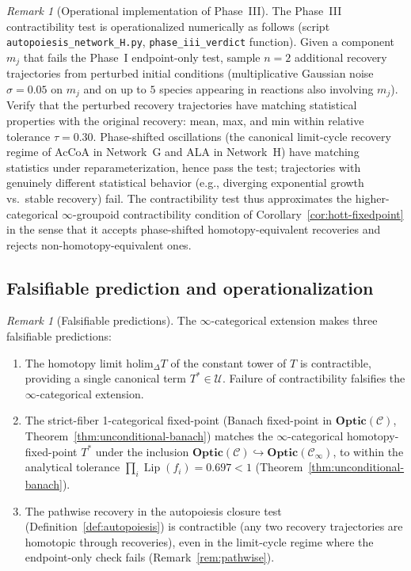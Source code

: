 \documentclass[11pt,a4paper]{article}
\theoremstyle{plain}
\theoremstyle{definition}
\theoremstyle{remark}
\newtheorem{remark}[theorem]{Remark}
\newcommand{\Optic}{\mathbf{Optic}}
\DeclareMathOperator{\Lip}{Lip}
\begin{document}
\begin{remark}[Operational implementation of Phase~III]
\label{rem:phase3-operational}
The Phase~III contractibility test is operationalized numerically as
follows (script \texttt{autopoiesis\_network\_H.py},
\texttt{phase\_iii\_verdict} function). Given a component $m_j$ that
fails the Phase~I endpoint-only test, sample $n = 2$ additional recovery
trajectories from perturbed initial conditions (multiplicative Gaussian
noise $\sigma = 0.05$ on $m_j$ and on up to $5$ species appearing in
reactions also involving $m_j$). Verify that the perturbed recovery
trajectories have matching statistical properties with the original
recovery: mean, max, and min within relative tolerance
$\tau = 0.30$. Phase-shifted oscillations (the canonical limit-cycle
recovery regime of AcCoA in Network~G and ALA in Network~H) have
matching statistics under reparameterization, hence pass the test;
trajectories with genuinely different statistical behavior (e.g.,
diverging exponential growth vs.\ stable recovery) fail. The
contractibility test thus approximates the higher-categorical
$\infty$-groupoid contractibility condition of Corollary~\ref{cor:hott-fixedpoint}
in the sense that it accepts phase-shifted homotopy-equivalent
recoveries and rejects non-homotopy-equivalent ones.
\end{remark}

\subsection{Falsifiable prediction and operationalization}

\begin{remark}[Falsifiable predictions]
\label{rem:hott-falsifiable}
The $\infty$-categorical extension makes three falsifiable predictions:
\begin{enumerate}[leftmargin=*, itemsep=2pt]
\item The homotopy limit $\mathrm{holim}_\Delta T$ of the constant tower
of $T$ is contractible, providing a single canonical term $T^* \in
\mathcal{U}$. Failure of contractibility falsifies the
$\infty$-categorical extension.
\item The strict-fiber 1-categorical fixed-point (Banach fixed-point in
$\Optic(\mathcal{C})$, Theorem~\ref{thm:unconditional-banach}) matches
the $\infty$-categorical homotopy-fixed-point $T^*$ under the
inclusion $\Optic(\mathcal{C}) \hookrightarrow
\Optic(\mathcal{C}_\infty)$, to within the analytical tolerance
$\prod_i \Lip(f_i) = 0.697 < 1$
(Theorem~\ref{thm:unconditional-banach}).
\item The pathwise recovery in the autopoiesis closure test
(Definition~\ref{def:autopoiesis}) is contractible (any two recovery
trajectories are homotopic through recoveries), even in the limit-cycle
regime where the endpoint-only check fails (Remark~\ref{rem:pathwise}).
\end{enumerate}
\end{remark}
\end{document}
